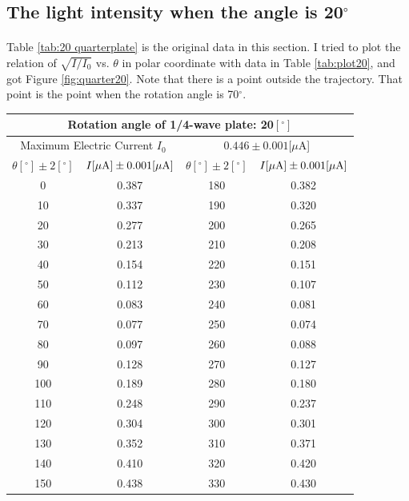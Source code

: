 \documentclass{my_template}
\begin{document}
    \subsection{The light intensity when the angle is 20$^\circ$}\label{sec:20}
    \paragraph{} Table \ref{tab:20 quarterplate} is the original data in this section. I tried to plot the relation of $\sqrt{I/I_0}$ vs. $\theta$ in polar coordinate with data in Table \ref{tab:plot20}, and got Figure \ref{fig:quarter20}. Note that there is a point outside the trajectory. That point is the point when the rotation angle is 70$^\circ$.
    \begin{table}[!ht]
        \centering
        \begin{tabular}{|c|c||c|c|}
            \hline
            \multicolumn{4}{|c|}{Rotation angle of 1/4-wave plate: 20$[^\circ]$}\\\hline
            \multicolumn{2}{|c||}{Maximum Electric Current $I_0$}&\multicolumn{2}{c|}{$0.446\pm 0.001[\mu$A]}\\\hline
            $\theta[^\circ]\pm 2[^\circ]$&$I[\mu \rm A]\pm 0.001 [\mu A]$&$\theta[^\circ]\pm 2[^\circ]$&$I[\mu \rm A]\pm 0.001 [\mu A]$\\\hline
            0&0.387&180&0.382\\\hline
            10&0.337&190&0.320\\\hline
            20&0.277&200&0.265\\\hline
            30&0.213&210&0.208\\\hline
            40&0.154&220&0.151\\\hline
            50&0.112&230&0.107\\\hline
            60&0.083&240&0.081\\\hline
            70&0.077&250&0.074\\\hline
            80&0.097&260&0.088\\\hline
            90&0.128&270&0.127\\\hline
            100&0.189&280&0.180\\\hline
            110&0.248&290&0.237\\\hline
            120&0.304&300&0.301\\\hline
            130&0.352&310&0.371\\\hline
            140&0.410&320&0.420\\\hline
            150&0.438&330&0.430\\\hline

\end{tabular}
\end{table}
\end{document}
